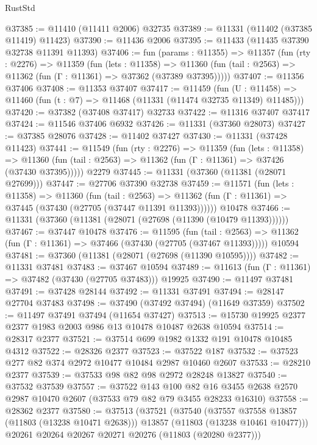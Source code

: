 \begin{lexlean}{RustStd}
\begin{coremodule}
@37385 := @11410 (@11411 @2006) @32735
@37389 := @11331 (@11402 (@37385 @11419) @11423)
@37390 := @11436 @2006
@37395 := @11433 (@11435 @37390 @32738 @11391 @11393)
@37406 := fun (params : @11355) =>
  @11357
    (fun (rty : @2276) =>
    @11359
      (fun (lets : @11358) =>
      @11360 (fun (tail : @2563) => @11362 (fun (Γ : @11361) => @37362 (@37389 @37395)))))
@37407 := @11356 @37406
@37408 := @11353 @37407
@37417 := @11459
    (fun (U : @11458) => @11460 (fun (t : @7) => @11468 (@11331 (@11474 @32735 @11349) @11485)))
@37420 := @37382 (@37408 @37417) @32733
@37422 := @11316 @37407 @37417
@37424 := @11546 @37406 @6932
@37426 := @11331 (@37360 @28073)
@37427 := @37385 @28076
@37428 := @11402 @37427
@37430 := @11331 (@37428 @11423)
@37441 := @11549
    (fun (rty : @2276) =>
    @11359
      (fun (lets : @11358) =>
      @11360 (fun (tail : @2563) => @11362 (fun (Γ : @11361) => @37426 (@37430 @37395)))))
    @2279
@37445 := @11331 (@37360 (@11381 (@28071 @27699)))
@37447 := @27706 @37390 @32738
@37459 := @11571
    (fun (lets : @11358) =>
    @11360
      (fun (tail : @2563) =>
      @11362 (fun (Γ : @11361) => @37445 (@37430 (@27705 (@37447 @11391 @11393))))))
    @10478
@37466 := @11331 (@37360 (@11381 (@28071 (@27698 (@11390 (@10479 @11393))))))
@37467 := @37447 @10478
@37476 := @11595
    (fun (tail : @2563) => @11362 (fun (Γ : @11361) => @37466 (@37430 (@27705 (@37467 @11393)))))
    @10594
@37481 := @37360 (@11381 (@28071 (@27698 (@11390 @10595))))
@37482 := @11331 @37481
@37483 := @37467 @10594
@37489 := @11613 (fun (Γ : @11361) => @37482 (@37430 (@27705 @37483))) @19925
@37490 := @11497 @37481
@37491 := @37428 @28144
@37492 := @11331 @37491
@37494 := @28147 @27704 @37483
@37498 := @37490 (@37492 @37494) (@11649 @37359)
@37502 := @11497 @37491 @37494 (@11654 @37427)
@37513 := @15730 @19925 @2377 @2377 @1983 @2003 @986 @13 @10478 @10487 @2638 @10594
@37514 := @28317 @2377
@37521 := @37514 @699 @1982 @1332 @191 @10478 @10485 @4312
@37522 := @28326 @2377
@37523 := @37522 @187
@37532 := @37523 @277 @82 @374 @2972 @10477 @10484 @2987 @10460 @2607
@37533 := @28210 @2377
@37539 := @37533 @98 @82 @98 @2972 @28248 @13827
@37540 := @37532 @37539
@37557 := @37522
    @143
    @100
    @82
    @16
    @3455
    @2638
    @2570
    @2987
    @10470
    @2607
    (@37533 @79 @82 @79 @3455 @28233 @16310)
@37558 := @28362 @2377
@37580 := @37513
    (@37521
      (@37540
        (@37557 @37558 @13857 (@11803 (@13238 @10471 @2638)))
        @13857
        (@11803 (@13238 @10461 @10477)))
      @20261
      @20264
      @20267
      @20271
      @20276
      (@11803 (@20280 @2377)))

\end{coremodule}
\end{lexlean}
